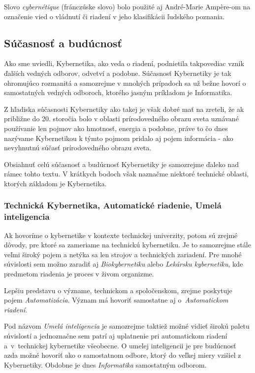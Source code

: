 \documentclass[a4paper, 10pt, ]{article}
\begin{document}
Slovo \emph{cybernétique} (fránczúske slovo) bolo použité aj André-Marie Ampère-om na označenie vied o vládnutí či riadení v jeho klasifikácii ľudského poznania.





\subsection{Súčasnosť a budúcnosť}

Ako sme uviedli, Kybernetika, ako veda o riadení, podnietila takpovediac vznik ďalších vedných odborov, odvetví a podobne. Súčasnosť Kybernetiky je tak ohromujúco rozmanitá a samozrejme v mnohých prípadoch sa už bežne hovorí o samostatných vedných odboroch, ktorého jasným príkladom je Informatika.

Z hľadiska súčasnosti Kybernetiky ako takej je však dobré mať na zreteli, že ak približne do 20. storočia bolo v oblasti prírodovedného obrazu sveta uznávané používanie len pojmov ako hmotnosť, energia a podobne, práve to čo dnes nazývame Kybernetikou k týmto pojmom pridalo aj pojem informácia - ako nevyhnutnú súčasť prírodovedného obrazu sveta.

Obsiahnuť celú súčasnosť a budúcnosť Kybernetiky je samozrejme ďaleko nad rámec tohto textu. V krátkych bodoch však naznačme niektoré technické oblasti, ktorých základom je Kybernetika.



\subsubsection{Technická Kybernetika, Automatické riadenie, Umelá inteligencia}

Ak hovoríme o kybernetike v kontexte technickej univerzity, potom sú zrejmé dôvody, pre ktoré sa zameriame na technickú kybernetiku. Je to samozrejme stále veľmi široký pojem a netýka sa len strojov a technických zariadení. Pre mnohé súvislosti sem možno zaradiť aj \emph{Biokybernetiku} alebo \emph{Lekársku kybernetiku}, kde predmetom riadenia je proces v živom organizme.

Lepšiu predstavu o význame, technickom a spoločenskom, zrejme poskytuje pojem \emph{Automatizácia}. Význam má hovoriť samostatne aj o~\emph{Automatickom riadení}.

Pod názvom \emph{Umelá inteligencia} je samozrejme taktiež možné vidieť širokú paletu súvislostí a jednoznačne sem patrí aj uplatnenie pri automatickom riadení a~v~technickej kybernetike všeobecne. O umelej inteligencii je pre budúcnosť azda možné hovoriť ako o samostatnom odbore, ktorý do veľkej miery vzišiel z Kybernetiky. Obdobne je dnes \emph{Informatika} samostatným odborom.
\end{document}
